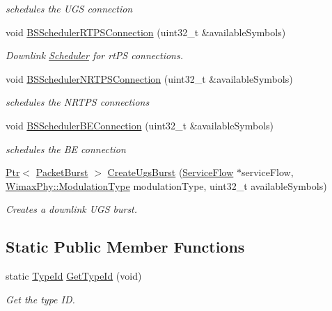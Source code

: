 \begin{DoxyCompactItemize}
\begin{DoxyCompactList}\small\item\em schedules the U\+GS connection \end{DoxyCompactList}\item 
void \hyperlink{classns3_1_1BSSchedulerRtps_acb75718835482da98c9b7eafc756dc4c}{B\+S\+Scheduler\+R\+T\+P\+S\+Connection} (uint32\+\_\+t \&available\+Symbols)
\begin{DoxyCompactList}\small\item\em Downlink \hyperlink{classns3_1_1Scheduler}{Scheduler} for rt\+PS connections. \end{DoxyCompactList}\item 
void \hyperlink{classns3_1_1BSSchedulerRtps_ae148375221d20545e3f54ac024c933c4}{B\+S\+Scheduler\+N\+R\+T\+P\+S\+Connection} (uint32\+\_\+t \&available\+Symbols)
\begin{DoxyCompactList}\small\item\em schedules the N\+R\+T\+PS connections \end{DoxyCompactList}\item 
void \hyperlink{classns3_1_1BSSchedulerRtps_a74fd827556c1b6f8b58ecdb2720a36d5}{B\+S\+Scheduler\+B\+E\+Connection} (uint32\+\_\+t \&available\+Symbols)
\begin{DoxyCompactList}\small\item\em schedules the BE connection \end{DoxyCompactList}\item 
\hyperlink{classns3_1_1Ptr}{Ptr}$<$ \hyperlink{classns3_1_1PacketBurst}{Packet\+Burst} $>$ \hyperlink{classns3_1_1BSSchedulerRtps_a638694f9cafedabeaf7027951a66cc04}{Create\+Ugs\+Burst} (\hyperlink{classns3_1_1ServiceFlow}{Service\+Flow} $\ast$service\+Flow, \hyperlink{classns3_1_1WimaxPhy_a044c5d8a48ca992c39c2a946f6e755fa}{Wimax\+Phy\+::\+Modulation\+Type} modulation\+Type, uint32\+\_\+t available\+Symbols)
\begin{DoxyCompactList}\small\item\em Creates a downlink U\+GS burst. \end{DoxyCompactList}\end{DoxyCompactItemize}
\subsection*{Static Public Member Functions}
\begin{DoxyCompactItemize}
\item 
static \hyperlink{classns3_1_1TypeId}{Type\+Id} \hyperlink{classns3_1_1BSSchedulerRtps_af72d432e566999dae12237842c07f7e0}{Get\+Type\+Id} (void)
\begin{DoxyCompactList}\small\item\em Get the type ID. \end{DoxyCompactList}\end{DoxyCompactItemize}
